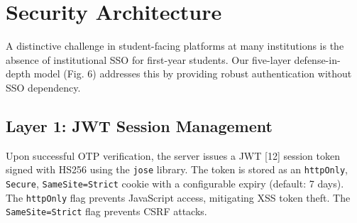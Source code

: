 \documentclass[12pt,a4paper]{article}
\begin{document}
\section{Security Architecture}

A distinctive challenge in student-facing platforms at many institutions is the absence of institutional SSO for first-year students. Our five-layer defense-in-depth model (Fig. 6) addresses this by providing robust authentication without SSO dependency.

\begin{figure}[H]
\centering
{}
\end{figure}

\subsection{Layer 1: JWT Session Management}

Upon successful OTP verification, the server issues a JWT [12] session token signed with HS256 using the \texttt{jose} library. The token is stored as an \texttt{httpOnly}, \texttt{Secure}, \texttt{SameSite=Strict} cookie with a configurable expiry (default: 7 days). The \texttt{httpOnly} flag prevents JavaScript access, mitigating XSS token theft. The \texttt{SameSite=Strict} flag prevents CSRF attacks.
\end{document}
